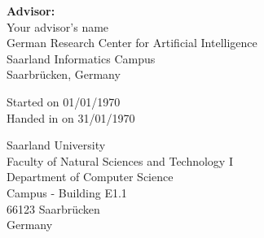 \pagestyle{empty}

\vspace*{0.5cm}
\textbf{Advisor:}\\
Your advisor's name\\
German Research Center for Artificial Intelligence\\
Saarland Informatics Campus\\
Saarbrücken, Germany

\vspace{4.5cm}
Started on 01/01/1970\\
Handed in on 31/01/1970


\vspace{4.5cm}


\vspace{3cm}
Saarland University\\
Faculty of Natural Sciences and Technology I\\
Department of Computer Science\\
Campus - Building E1.1\\
66123 Saarbrücken\\
Germany\\


